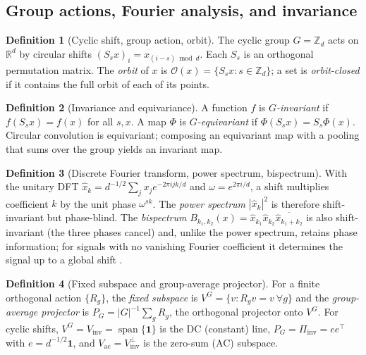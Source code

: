 \documentclass[11pt]{article}
\theoremstyle{plain}
\theoremstyle{definition}
\newtheorem{definition}{Definition}
\theoremstyle{remark}
\newcommand{\R}{\mathbb{R}}
\newcommand{\Z}{\mathbb{Z}}
\newcommand{\Vinv}{V_{\mathrm{inv}}}
\newcommand{\Vac}{V_{\mathrm{ac}}}
\newcommand{\one}{\mathbf 1}
\newcommand{\Piinv}{\Pi_{\mathrm{inv}}}
\newcommand{\Orb}{\mathcal O}
\begin{document}
\subsection{Group actions, Fourier analysis, and invariance}\label{sec:background-group}
\begin{definition}[Cyclic shift, group action, orbit]
The cyclic group $G=\Z_d$ acts on $\R^d$ by circular shifts $(S_sx)_i=x_{(i-s)\bmod d}$.  Each $S_s$ is an orthogonal permutation matrix.  The \emph{orbit} of $x$ is $\Orb(x)=\{S_sx:s\in\Z_d\}$; a set is \emph{orbit-closed} if it contains the full orbit of each of its points.
\end{definition}

\begin{definition}[Invariance and equivariance]
A function $f$ is \emph{$G$-invariant} if $f(S_sx)=f(x)$ for all $s,x$.  A map $\Phi$ is \emph{$G$-equivariant} if $\Phi(S_sx)=S_s\Phi(x)$.  Circular convolution is equivariant; composing an equivariant map with a pooling that sums over the group yields an invariant map.
\end{definition}

\begin{definition}[Discrete Fourier transform, power spectrum, bispectrum]\label{def:dft}
With the unitary DFT $\hat x_k=d^{-1/2}\sum_{j}x_je^{-2\pi ijk/d}$ and $\omega=e^{2\pi i/d}$, a shift multiplies coefficient $k$ by the unit phase $\omega^{sk}$.  The \emph{power spectrum} $|\hat x_k|^2$ is therefore shift-invariant but phase-blind.  The \emph{bispectrum} $B_{k_1,k_2}(x)=\hat x_{k_1}\hat x_{k_2}\overline{\hat x_{k_1+k_2}}$ is also shift-invariant (the three phases cancel) and, unlike the power spectrum, retains phase information; for signals with no vanishing Fourier coefficient it determines the signal up to a global shift \citep{Kakarala2012}.
\end{definition}

\begin{definition}[Fixed subspace and group-average projector]
For a finite orthogonal action $\{R_g\}$, the \emph{fixed subspace} is $V^G=\{v:R_gv=v\ \forall g\}$ and the \emph{group-average projector} is $P_G=|G|^{-1}\sum_g R_g$, the orthogonal projector onto $V^G$.  For cyclic shifts, $V^G=\Vinv=\operatorname{span}\{\one\}$ is the DC (constant) line, $P_G=\Piinv=ee^\top$ with $e=d^{-1/2}\one$, and $\Vac=\Vinv^\perp$ is the zero-sum (AC) subspace.
\end{definition}
\end{document}
